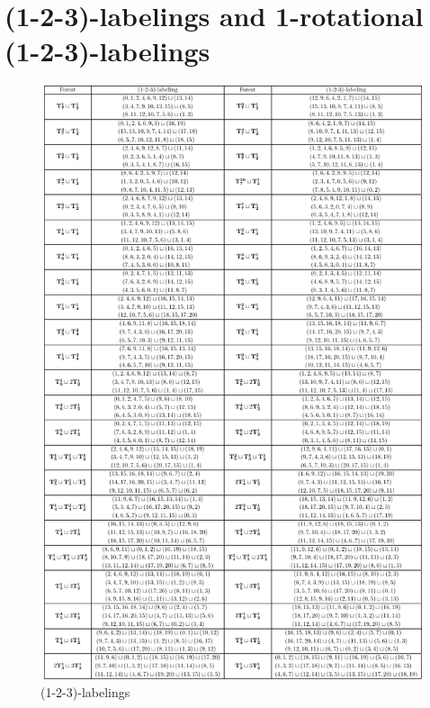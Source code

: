 \documentclass{dmgt}
\begin{document}
\section{(1-2-3)-labelings and 1-rotational (1-2-3)-labelings}
\begin{figure}[H]
\centering
    \includegraphics[scale=0.9]{7(mod 14).pdf}
    \caption{(1-2-3)-labelings}
    \label{fig:7mod14}
\end{figure}
\newpage
\end{document}
